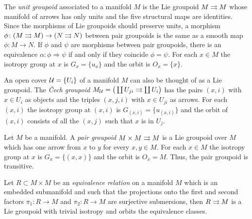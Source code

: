 %
%

\begin{example}[manifolds]\label{ex:unit}
The \emph{unit groupoid} associated to a manifold $M$ is the Lie groupoid $M\rightrightarrows M$ whose manifold of arrows has only units and the five structural maps are identities.
Since the morphisms of Lie groupoids should preserve units, a morphism $\phi\colon (M\rightrightarrows M)\to (N\rightrightarrows N)$ between pair groupoids is the same as a smooth map $\phi\colon M\to N$.
If $\phi$ and $\psi$ are morphisms between pair groupoids, there is an equivalence $\alpha\colon\phi\Rightarrow\psi$ if and only if they coincide $\phi=\psi$.
For each $x\in M$ the isotropy group at $x$ is $G_x = \{ u_x \}$ and the orbit is $O_x = \{ x \}$.
\end{example}

\begin{example}\label{ex:cover}
An open cover $\mathcal{U}=\{U_i\}$ of a manifold $M$ can also be thought of as a Lie groupoid.
The \emph{\v Cech groupoid} \( M_{\mathcal{U}} = \big( \coprod U_{ji}\rightrightarrows \coprod U_i \big) \) has the pairs $(x,i)$ with $x\in U_i$ as objects and the triples $(x,j,i)$ with $x\in U_{ji}$ as arrows.
For each $(x,i)$ the isotropy group at $(x,i)$ is $G_{(x,i)}=\{u_{(x,i)}\}$ and the orbit of $(x,i)$ consists of all the $(x,j)$ such that $x$ is in $U_j$.
\end{example}

\begin{example}\label{ex:pair}
Let $M$ be a manifold.
A \emph{pair groupoid} $M\times M\rightrightarrows M$ is a Lie groupoid over $M$ which has one arrow from $x$ to $y$ for every $x,y\in M$.
For each $x\in M$ the isotropy group at $x$ is $G_x = \{(x,x)\}$ and the orbit is $O_x = M$.
Thus, the pair groupoid is transitive.
\end{example}

\begin{example}
Let $R\subset M\times M$ be an \emph{equivalence relation} on a manifold $M$ which is an embedded submanifold and such that the projections onto the first and second factors $\pi_1\colon R\to M$ and $\pi_2\colon R\to M$ are surjective submersions, then $R\rightrightarrows M$ is a Lie groupoid with trivial isotropy and orbits the equivalence classes.
\end{example}

